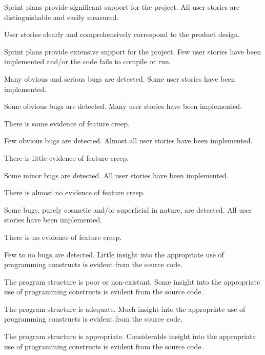 \documentclass{../../fal_assignment}
\begin{document}
\begin{markingrubric}
            \par Sprint plans provide significant support for the project.
        \grade All user stories are distinguishable and easily measured.
            \par User stories clearly and comprehensively correspond to the product design.
            \par Sprint plans provide extensive support for the project.
%
        \grade \fail Few user stories have been implemented  and/or the code fails to compile or run.
            \par Many obvious and serious bugs are detected.
        \grade Some user stories have been implemented.
            \par Some obvious bugs are detected.
        \grade Many user stories have been implemented.
            \par There is some evidence of feature creep.
            \par Few obvious bugs  are detected.
        \grade Almost all user stories have been implemented.
            \par There is little evidence of feature creep.
            \par Some minor bugs  are detected.
        \grade All user stories have been implemented.
            \par There is almost no evidence of feature creep.
            \par Some bugs, purely cosmetic and/or superficial in nature, are detected.
        \grade All user stories have been implemented.
            \par There is no evidence of feature creep.
            \par Few to no bugs are detected.
%
        \grade \fail Little insight into the appropriate use of programming constructs is evident from the source code.
            \par The program structure is poor or non-existant.
        \grade Some insight into the appropriate use of programming constructs is evident from the source code.
            \par The program structure is adequate.
        \grade Much insight into the appropriate use of programming constructs is evident from the source code.
            \par The program structure is appropriate.
        \grade Considerable insight into the appropriate use of programming constructs is evident from the source code.

\end{markingrubric}
\end{document}
